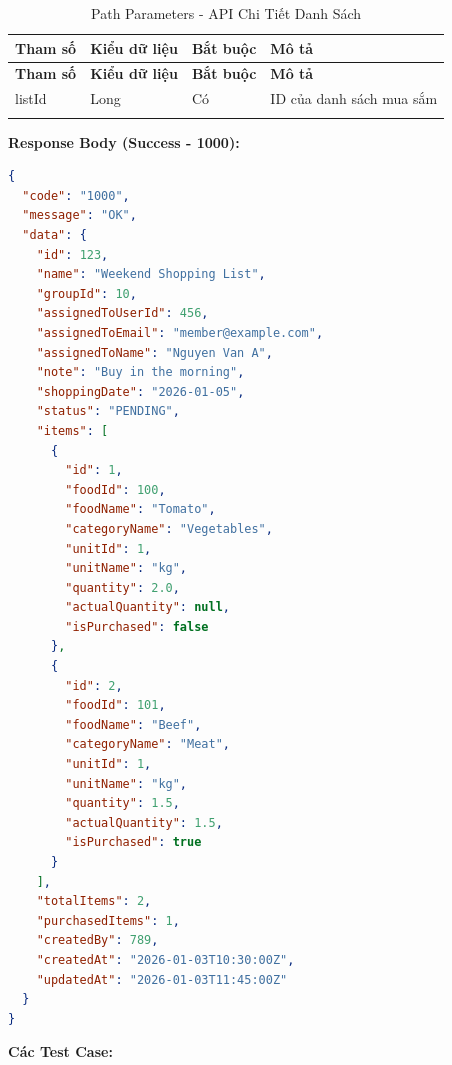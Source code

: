 \small
\begin{longtable}{|>{\raggedright\arraybackslash}p{3cm}|>{\raggedright\arraybackslash}p{2.5cm}|>{\raggedright\arraybackslash}p{2cm}|>{\raggedright\arraybackslash}p{6cm}|}
\hline
\textbf{Tham số} & \textbf{Kiểu dữ liệu} & \textbf{Bắt buộc} & \textbf{Mô tả} \\
\hline
\endfirsthead
\hline
\textbf{Tham số} & \textbf{Kiểu dữ liệu} & \textbf{Bắt buộc} & \textbf{Mô tả} \\
\hline
\endhead
listId & Long & Có & ID của danh sách mua sắm \\
\hline
\caption{Path Parameters - API Chi Tiết Danh Sách}
\end{longtable}

\textbf{Response Body (Success - 1000):}

\begin{lstlisting}[language=json, caption=Response thanh cong API 1.3]
{
  "code": "1000",
  "message": "OK",
  "data": {
    "id": 123,
    "name": "Weekend Shopping List",
    "groupId": 10,
    "assignedToUserId": 456,
    "assignedToEmail": "member@example.com",
    "assignedToName": "Nguyen Van A",
    "note": "Buy in the morning",
    "shoppingDate": "2026-01-05",
    "status": "PENDING",
    "items": [
      {
        "id": 1,
        "foodId": 100,
        "foodName": "Tomato",
        "categoryName": "Vegetables",
        "unitId": 1,
        "unitName": "kg",
        "quantity": 2.0,
        "actualQuantity": null,
        "isPurchased": false
      },
      {
        "id": 2,
        "foodId": 101,
        "foodName": "Beef",
        "categoryName": "Meat",
        "unitId": 1,
        "unitName": "kg",
        "quantity": 1.5,
        "actualQuantity": 1.5,
        "isPurchased": true
      }
    ],
    "totalItems": 2,
    "purchasedItems": 1,
    "createdBy": 789,
    "createdAt": "2026-01-03T10:30:00Z",
    "updatedAt": "2026-01-03T11:45:00Z"
  }
}
\end{lstlisting}

\textbf{Các Test Case:}

